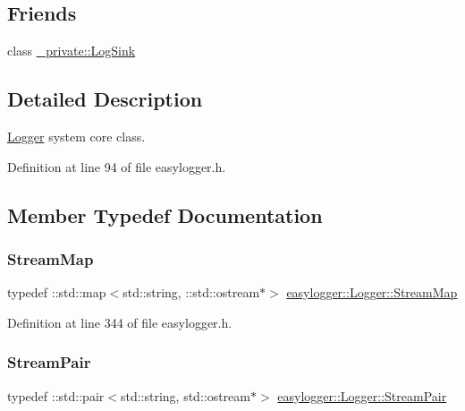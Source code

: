 \subsection*{Friends}
\begin{DoxyCompactItemize}
\item 
class \mbox{\hyperlink{classeasylogger_1_1_logger_a27353f6b5bf33ecd1b185b743973fb72}{\+\_\+private\+::\+Log\+Sink}}
\end{DoxyCompactItemize}


\subsection{Detailed Description}
\mbox{\hyperlink{classeasylogger_1_1_logger}{Logger}} system core class. 

Definition at line 94 of file easylogger.\+h.



\subsection{Member Typedef Documentation}
\mbox{\label{classeasylogger_1_1_logger_a27625e597ce11062ffd04fc8ca5154cd}} 
\subsubsection{\texorpdfstring{Stream\+Map}{StreamMap}}
{\footnotesize\ttfamily typedef \+::std\+::map$<$std\+::string, \+::std\+::ostream$\ast$$>$ \mbox{\hyperlink{classeasylogger_1_1_logger_a27625e597ce11062ffd04fc8ca5154cd}{easylogger\+::\+Logger\+::\+Stream\+Map}}\hspace{0.3cm}{\ttfamily [private]}}



Definition at line 344 of file easylogger.\+h.

\mbox{\label{classeasylogger_1_1_logger_a8c37cd26d5210c8ede4cd355a6bceb95}} 
\subsubsection{\texorpdfstring{Stream\+Pair}{StreamPair}}
{\footnotesize\ttfamily typedef \+::std\+::pair$<$std\+::string, std\+::ostream$\ast$$>$ \mbox{\hyperlink{classeasylogger_1_1_logger_a8c37cd26d5210c8ede4cd355a6bceb95}{easylogger\+::\+Logger\+::\+Stream\+Pair}}\hspace{0.3cm}{\ttfamily [private]}}




